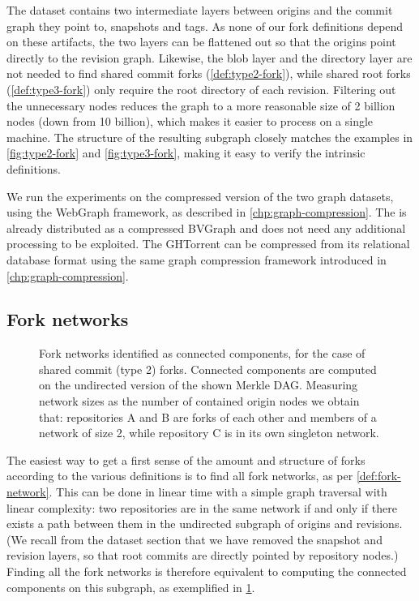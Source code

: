 The dataset contains two intermediate layers between origins and the
commit graph they point to, snapshots and tags. As none of our fork definitions
depend on these artifacts, the two layers can be flattened out so that the
origins point directly to the revision graph.  Likewise, the blob layer and the
directory layer are not needed to find shared commit forks
(\cref{def:type2-fork}), while shared root forks
(\cref{def:type3-fork}) only require the root directory of each
revision.  Filtering out the unnecessary nodes reduces the graph to a more
reasonable size of 2 billion nodes (down from 10 billion), which makes it
easier to process on a single machine. The structure of the resulting subgraph
closely matches the examples in \cref{fig:type2-fork} and
\cref{fig:type3-fork}, making it easy to verify the intrinsic definitions.

We run the experiments on the compressed version of the two graph datasets,
using the WebGraph framework, as described in \cref{chp:graph-compression}.
The \SWHGD{} is already distributed as a compressed BVGraph and does not need
any additional processing to be exploited.
The GHTorrent can be compressed from its relational
database format using the same graph compression framework introduced in
\cref{chp:graph-compression}.

\subsection{Fork networks}%
\label{sec:methodology-fork-networks}

\begin{figure}[t]
  \centering
  
  \caption{Fork networks identified as connected components, for the case of
    shared commit (type 2) forks. Connected components are computed on the
    undirected version of the shown Merkle DAG\@. Measuring network sizes as
    the number of contained origin nodes we obtain that: repositories A and B
    are forks of each other and members of a network of size 2, while
    repository C is in its own singleton network.}%
  \label{fig:fork-clusters}
\end{figure}

The easiest way to get a first sense of the amount and structure of forks
according to the various definitions is to find all fork networks, as per
\cref{def:fork-network}. This can be done in linear time with a
simple graph traversal with linear complexity: two repositories are in the same
network if and only if there exists a path between them in the undirected
subgraph of origins and revisions. (We recall from the dataset section that we
have removed the snapshot and revision layers, so that root commits are
directly pointed by repository nodes.) Finding all the fork networks is
therefore equivalent to computing the connected components on this subgraph, as
exemplified in \cref{fig:fork-clusters}.

